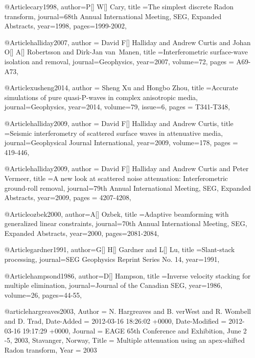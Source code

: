 @Article{cary1998,
  author={P[] W[] Cary},
  title ={The simplest discrete Radon transform},
  journal={68th Annual International Meeting, SEG, Expanded Abstracts},
  year=1998,
  pages={1999-2002},
}




@Article{halliday2007,
  author = {David F[] Halliday and Andrew Curtis  and Johan O[] A[] Robertsson and Dirk-Jan van~Manen},
  title ={Interferometric surface-wave isolation and removal},
  journal={Geophysics},
  year=2007,
  volume={72},
  pages = {A69-A73},
}

@Article{xusheng2014,
  author = {Sheng Xu and Hongbo Zhou},
  title ={Accurate simulations of pure quasi-P-waves in complex anisotropic media},
  journal={Geophysics},
  year=2014,
  volume={79},
  issue=6,
  pages = {T341-T348},
}

@Article{halliday2009,
  author = {David F[] Halliday and Andrew Curtis},
  title ={Seismic interferometry of scattered surface waves in attenuative media},
  journal={Geophysical Journal International},
  year=2009,
  volume={178},
  pages = {419-446},
}





@Article{halliday2009,
  author = {David F[] Halliday and Andrew Curtis and Peter Vermeer},
  title ={A new look at scattered noise attenuation: Interferometric ground-roll removal},
  journal={79th Annual International Meeting, SEG, Expanded Abstracts},
  year=2009,
  pages = {4207-4208},
}

@Article{ozbek2000,
  author={A[] Ozbek},
  title ={Adaptive beamforming with generalized linear constraints},
  journal={70th Annual International Meeting, SEG, Expanded Abstracts},
  year=2000,
  pages={2081-2084},
}



@Article{gardner1991,
  author={G[] H[] Gardner and L[] Lu},
  title ={Slant-stack processing},
  journal={SEG Geophysics Reprint Series No. 14},
  year=1991,
}

@Article{hampsond1986,
  author={D[] Hampson},
  title ={Inverse velocity stacking for multiple elimination},
  journal={Journal of the Canadian SEG},
  year=1986,
  volume=26,
  pages={44-55},
}

@article{hargreaves2003,
	Author = {N. Hargreaves and B. verWest and R. Wombell and D. Trad},
	Date-Added = {2012-03-16 18:26:02 +0000},
	Date-Modified = {2012-03-16 19:17:29 +0000},
	Journal = {EAGE 65th Conference and Exhibition, June 2 -5, 2003, Stavanger, Norway},
	Title = {Multiple attenuation using an apex-shifted {R}adon transform},
	Year = {2003}}

